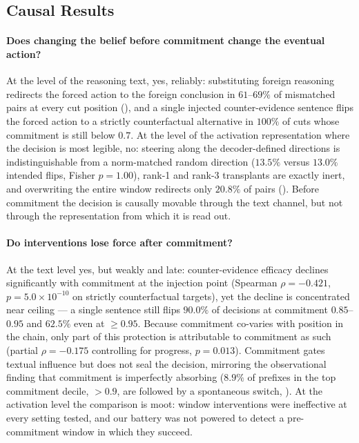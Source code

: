 \documentclass{article}
\begin{document}
\subsection{Causal Results}
\label{sec:causal-results}

\paragraph{Does changing the belief before commitment change the eventual action?}
At the level of the reasoning text, yes, reliably: substituting foreign reasoning redirects the forced action to the foreign conclusion in \(61\)--\(69\%\) of mismatched pairs at every cut position (), and a single injected counter-evidence sentence flips the forced action to a strictly counterfactual alternative in \(100\%\) of cuts whose commitment is still below \(0.7\).
At the level of the activation representation where the decision is most legible, no: steering along the decoder-defined directions is indistinguishable from a norm-matched random direction (\(13.5\%\) versus \(13.0\%\) intended flips, Fisher \(p=1.00\)), rank-1 and rank-3 transplants are exactly inert, and overwriting the entire window redirects only \(20.8\%\) of pairs ().
Before commitment the decision is causally movable through the text channel, but not through the representation from which it is read out.

\paragraph{Do interventions lose force after commitment?}
At the text level yes, but weakly and late: counter-evidence efficacy declines significantly with commitment at the injection point (Spearman \(\rho=-0.421\), \(p=5.0\times10^{-10}\) on strictly counterfactual targets), yet the decline is concentrated near ceiling --- a single sentence still flips \(90.0\%\) of decisions at commitment \(0.85\)--\(0.95\) and \(62.5\%\) even at \(\geq0.95\).
Because commitment co-varies with position in the chain, only part of this protection is attributable to commitment as such (partial \(\rho=-0.175\) controlling for progress, \(p=0.013\)).
Commitment gates textual influence but does not seal the decision, mirroring the observational finding that commitment is imperfectly absorbing (\(8.9\%\) of prefixes in the top commitment decile, \(>0.9\), are followed by a spontaneous switch, ).
At the activation level the comparison is moot: window interventions were ineffective at every setting tested, and our battery was not powered to detect a pre-commitment window in which they succeed.
\end{document}
